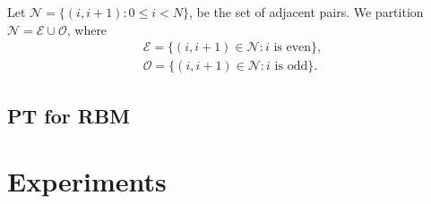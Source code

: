 \documentclass[12pt]{article}
\begin{document}
Let $\mathcal{N}=\{(i,i+1):0\leq i<N\}$, be the set of adjacent pairs. We partition $\mathcal{N}=\mathcal{E}\cup\mathcal{O}$, where
\begin{align*}
\mathcal{E}=\{(i,i+1)\in \mathcal{N}: i \text{ is even}\},\\
\mathcal{O}=\{(i,i+1)\in \mathcal{N}: i \text{ is odd}\}.
\end{align*}


\subsection{PT for RBM}
\section{Experiments}

 

\end{document}
